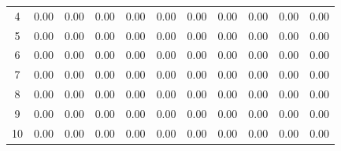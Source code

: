\begin{tabular}{c|cccccccccc}
4 &     0.00 &     0.00 &     0.00 &     0.00 &     0.00 &     0.00 &     0.00 &     0.00 &     0.00 &     0.00  \\ 
5 &     0.00 &     0.00 &     0.00 &     0.00 &     0.00 &     0.00 &     0.00 &     0.00 &     0.00 &     0.00  \\ 
6 &     0.00 &     0.00 &     0.00 &     0.00 &     0.00 &     0.00 &     0.00 &     0.00 &     0.00 &     0.00  \\ 
7 &     0.00 &     0.00 &     0.00 &     0.00 &     0.00 &     0.00 &     0.00 &     0.00 &     0.00 &     0.00  \\ 
8 &     0.00 &     0.00 &     0.00 &     0.00 &     0.00 &     0.00 &     0.00 &     0.00 &     0.00 &     0.00  \\ 
9 &     0.00 &     0.00 &     0.00 &     0.00 &     0.00 &     0.00 &     0.00 &     0.00 &     0.00 &     0.00  \\ 
10 &     0.00 &     0.00 &     0.00 &     0.00 &     0.00 &     0.00 &     0.00 &     0.00 &     0.00 &     0.00  \\ 
\hline \hline
\end{tabular}
